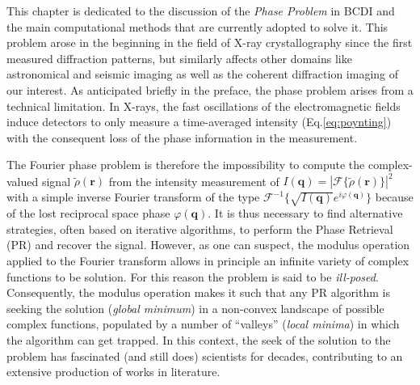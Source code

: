 
This chapter is dedicated to the discussion of the \textit{Phase Problem} in BCDI and the main computational methods 
that are currently adopted to solve it. This problem arose in the beginning in the field of X-ray crystallography since 
the first measured diffraction patterns, but similarly affects other domains like astronomical and seismic imaging as 
well as the coherent diffraction imaging of our interest. As anticipated briefly in the preface, the phase 
problem arises from a technical limitation. In X-rays, the fast oscillations of the electromagnetic fields induce detectors 
to only measure a time-averaged intensity (Eq.\ref{eq:poynting}) with the consequent loss of the phase information 
in the measurement.

The Fourier phase problem is therefore the impossibility to compute the complex-valued signal $\tilde{\rho}(\mathbf{r})$ 
from the intensity measurement of $I(\mathbf{q}) = |\mathcal{F}\{\tilde{\rho}(\mathbf{r})\}|^2 $ with a simple 
inverse Fourier transform of the type $\mathcal{F}^{-1}\{\sqrt{I(\mathbf{q})}e^{i\varphi(\mathbf{q})}\}$ because of the lost 
reciprocal space phase $ \varphi(\mathbf{q}) $. It is thus necessary to find alternative strategies, often based on 
iterative algorithms, to perform the Phase Retrieval (PR) and recover the signal.
However, as one can suspect, the modulus operation applied to the Fourier transform
allows in principle an infinite variety of complex functions to be solution. For this reason the problem is said to be 
\textit{ill-posed}. Consequently, the modulus operation makes it such that any PR algorithm is seeking the solution 
(\textit{global minimum}) in a non-convex landscape of possible complex functions, populated by a number of ``valleys''
(\textit{local minima}) in which the algorithm can get trapped. In this context, the seek of the solution 
to the problem has fascinated (and still does) scientists for decades, contributing to an extensive production of works in 
literature.

